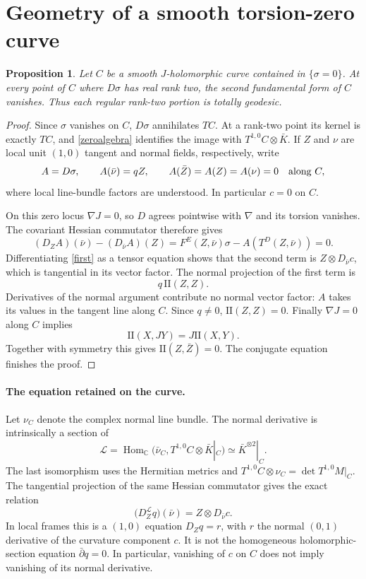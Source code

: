 \documentclass[11pt]{article}
\newtheorem{proposition}{Proposition}
\begin{document}
\section{Geometry of a smooth torsion-zero curve}
\begin{proposition}\label{geodesic}
Let $C$ be a smooth $J$-holomorphic curve contained in $\{\sigma=0\}$. At every point of $C$ where $D\sigma$ has real rank two, the second fundamental form of $C$ vanishes. Thus each regular rank-two portion is totally geodesic.
\end{proposition}
\begin{proof}
Since $\sigma$ vanishes on $C$, $D\sigma$ annihilates $TC$. At a rank-two point its kernel is exactly $TC$, and \eqref{zeroalgebra} identifies the image with $T^{1,0}C\otimes\bar K$. If $Z$ and $\nu$ are local unit $(1,0)$ tangent and normal fields, respectively, write
\[
A=D\sigma,\qquad A(\bar\nu)=q Z,\qquad A(\bar Z)=A(Z)=A(\nu)=0
\quad\hbox{along }C,
\]
where local line-bundle factors are understood. In particular $c=0$ on $C$.

On this zero locus $\nabla J=0$, so $D$ agrees pointwise with $\nabla$ and its torsion vanishes. The covariant Hessian commutator therefore gives
\[
(D_ZA)(\bar\nu)-(D_{\bar\nu}A)(Z)
=F^E(Z,\bar\nu)\sigma-A(T^D(Z,\bar\nu))=0.
\]
Differentiating \eqref{first} as a tensor equation shows that the second term is $Z\otimes D_{\bar\nu}c$, which is tangential in its vector factor. The normal projection of the first term is
\[
q\,\mathrm{II}(Z,Z).
\]
Derivatives of the normal argument contribute no normal vector factor: $A$ takes its values in the tangent line along $C$. Since $q\ne0$, $\mathrm{II}(Z,Z)=0$. Finally $\nabla J=0$ along $C$ implies
\[
\mathrm{II}(X,JY)=J\mathrm{II}(X,Y).
\]
Together with symmetry this gives $\mathrm{II}(Z,\bar Z)=0$. The conjugate equation finishes the proof.
\end{proof}

\paragraph{The equation retained on the curve.}
Let $\nu_C$ denote the complex normal line bundle. The normal derivative is intrinsically a section of
\begin{equation}\label{qline}
\mathcal L=\operatorname{Hom}_{\mathbb C}
 (\bar\nu_C,T^{1,0}C\otimes\bar K|_C)
 \simeq \bar K^{\otimes2}|_C.
\end{equation}
The last isomorphism uses the Hermitian metrics and
$T^{1,0}C\otimes\nu_C=\det T^{1,0}M|_C$.
The tangential projection of the same Hessian commutator gives the exact relation
\begin{equation}\label{inhom}
\bigl(D_Z^{\mathcal L}q\bigr)(\bar\nu)
=Z\otimes D_{\bar\nu}c.
\end{equation}
In local frames this is a $(1,0)$ equation $D_Zq=r$, with $r$ the normal $(0,1)$ derivative of the curvature component $c$. It is not the homogeneous holomorphic-section equation $\bar\partial q=0$. In particular, vanishing of $c$ on $C$ does not imply vanishing of its normal derivative.
\end{document}
